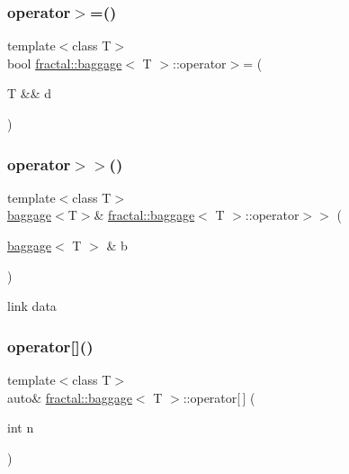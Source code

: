 \mbox{\label{classfractal_1_1baggage_ac1970dbf50991b785aa88707edce0e62}} 
\subsubsection{\texorpdfstring{operator$>$=()}{operator>=()}\hspace{0.1cm}{\footnotesize\ttfamily [2/2]}}
{\footnotesize\ttfamily template$<$class T$>$ \\
bool \hyperlink{classfractal_1_1baggage}{fractal\+::baggage}$<$ T $>$\+::operator$>$= (\begin{DoxyParamCaption}\item[{T \&\&}]{d }\end{DoxyParamCaption})\hspace{0.3cm}{\ttfamily [inline]}}

\mbox{\label{classfractal_1_1baggage_aadd6a156f9116e6b9b4afa36ce998567}} 
\subsubsection{\texorpdfstring{operator$>$$>$()}{operator>>()}}
{\footnotesize\ttfamily template$<$class T$>$ \\
\hyperlink{classfractal_1_1baggage}{baggage}$<$T$>$\& \hyperlink{classfractal_1_1baggage}{fractal\+::baggage}$<$ T $>$\+::operator$>$$>$ (\begin{DoxyParamCaption}\item[{\hyperlink{classfractal_1_1baggage}{baggage}$<$ T $>$ \&}]{b }\end{DoxyParamCaption})\hspace{0.3cm}{\ttfamily [inline]}}



link data 

\mbox{\label{classfractal_1_1baggage_a00f2d4993290a8be28c911904637d178}} 
\subsubsection{\texorpdfstring{operator[]()}{operator[]()}}
{\footnotesize\ttfamily template$<$class T$>$ \\
auto\& \hyperlink{classfractal_1_1baggage}{fractal\+::baggage}$<$ T $>$\+::operator\mbox{[}$\,$\mbox{]} (\begin{DoxyParamCaption}\item[{int}]{n }\end{DoxyParamCaption})\hspace{0.3cm}{\ttfamily [inline]}}


